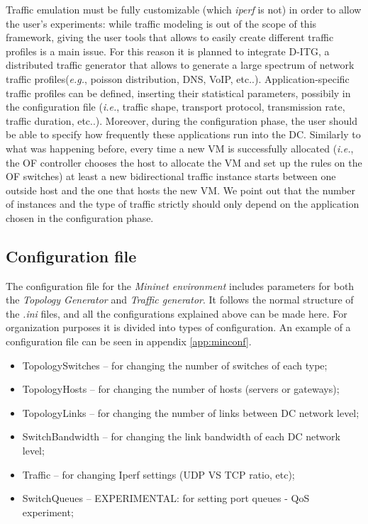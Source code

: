 \documentclass[12pt,english,oneside]{book}
\begin{document}
Traffic emulation must be fully customizable (which \textit{iperf} is not) in order to allow the user's experiments: while traffic modeling is out of the scope of this framework, giving the user tools that allows to easily create different traffic profiles is a main issue.
For this reason it is planned to integrate D-ITG\cite{gitg}, a distributed traffic generator that allows to generate a large spectrum of network traffic profiles({\it e.g.}, poisson distribution, DNS, VoIP, etc..).
Application-specific traffic profiles can be defined, inserting their statistical parameters, possibily in the configuration file ({\it i.e.}, traffic shape, transport protocol, transmission rate, traffic duration, etc..).
Moreover, during the configuration phase, the user should be able to specify how frequently these applications run into the DC.
Similarly to what was happening before, every time a new VM is successfully allocated ({\it i.e.}, the OF controller chooses the host to allocate the VM and set up the rules on the OF switches) at least a new bidirectional traffic instance starts between one outside host and the one that hosts the new VM.
We point out that the number of instances and the type of traffic strictly should only depend on the application chosen in the configuration phase.

\subsection{Configuration file}
\hspace{0.6cm}

The configuration file for the \textit{Mininet environment} includes parameters for both the \textit{Topology Generator} and \textit{Traffic generator}.
It follows the normal structure of the \textit{.ini} files, and all the configurations explained above can be made here. For organization purposes it is divided into types of configuration. An example of a configuration file can be seen in appendix \ref{app:minconf}.

\begin{itemize}
  \item TopologySwitches -- for changing the number of switches of each type;
  \item TopologyHosts -- for changing the number of hosts (servers or gateways);
  \item TopologyLinks -- for changing the number of links between DC network level;
  \item SwitchBandwidth -- for changing the link bandwidth of each DC network level;
  \item Traffic -- for changing Iperf settings (UDP VS TCP ratio, etc);
  \item SwitchQueues -- EXPERIMENTAL: for setting port queues - QoS experiment;
\end{itemize}
\end{document}
